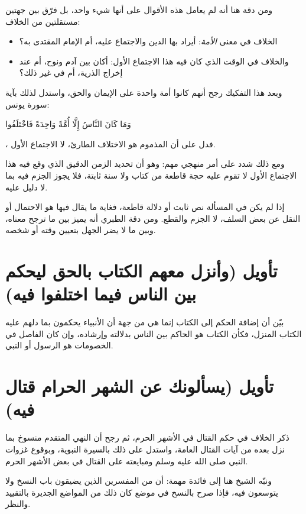 ومن دقة  هنا أنه لم يعامل هذه الأقوال على أنها شيء واحد، بل فرّق بين جهتين مستقلتين من الخلاف:
\begin{itemize}
    \item الخلاف في معنى \textit{الأمة}: أيراد بها الدين والاجتماع عليه، أم الإمام المقتدى به؟
    \item والخلاف في الوقت الذي كان فيه هذا الاجتماع الأول: أكان بين آدم ونوح، أم عند إخراج الذرية، أم في غير ذلك؟
\end{itemize}

وبعد هذا التفكيك رجح  أنهم كانوا أمة واحدة على الإيمان والحق، واستدل لذلك بآية سورة يونس: \begin{ayah}وَمَا كَانَ النَّاسُ إِلَّا أُمَّةً وَاحِدَةً فَاخْتَلَفُوا\end{ayah}، فدل على أن المذموم هو الاختلاف الطارئ، لا الاجتماع الأول.

ومع ذلك شدد على أمر منهجي مهم: وهو أن تحديد الزمن الدقيق الذي وقع فيه هذا الاجتماع الأول لا تقوم عليه حجة قاطعة من كتاب ولا سنة ثابتة، فلا يجوز الجزم فيه بما لا دليل عليه.

\begin{fawaid}
إذا لم يكن في المسألة نص ثابت أو دلالة قاطعة، فغاية ما يقال فيها هو الاحتمال أو النقل عن بعض السلف، لا الجزم والقطع. ومن دقة الطبري أنه يميز بين ما ترجح معناه، وبين ما لا يضر الجهل بتعيين وقته أو شخصه.
\end{fawaid}

\section{تأويل (وأنزل معهم الكتاب بالحق ليحكم بين الناس فيما اختلفوا فيه)}
بيّن  أن إضافة الحكم إلى الكتاب إنما هي من جهة أن الأنبياء يحكمون بما دلهم عليه الكتاب المنزل، فكأن الكتاب هو الحاكم بين الناس بدلالته وإرشاده، وإن كان الفاصل في الخصومات هو الرسول أو النبي.

\separator

\section{تأويل (يسألونك عن الشهر الحرام قتال فيه)}
ذكر  الخلاف في حكم القتال في الأشهر الحرم، ثم رجح أن النهي المتقدم منسوخ بما نزل بعده من آيات القتال العامة، واستدل على ذلك بالسيرة النبوية، وبوقوع غزوات النبي صلى الله عليه وسلم ومبايعته على القتال في بعض الأشهر الحرم.

ونبّه الشيخ هنا إلى فائدة مهمة: أن  من المفسرين الذين يضيقون باب النسخ ولا يتوسعون فيه، فإذا صرح بالنسخ في موضع كان ذلك من المواضع الجديرة بالتقييد والنظر.

